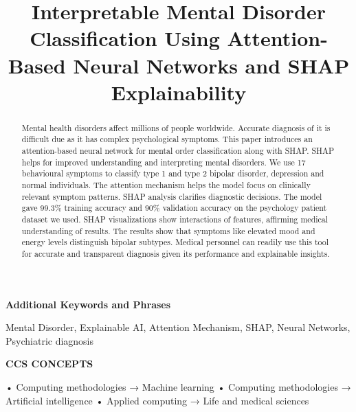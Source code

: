 \documentclass[conference]{IEEEtran}
\begin{document}
\title{Interpretable Mental Disorder Classification Using Attention-Based Neural Networks and SHAP Explainability}

\author{
\and 
{}
\and 
{}
}

\maketitle
\begin{abstract}
Mental health disorders affect millions of people worldwide. Accurate diagnosis of it is difficult due as it has complex psychological symptoms. This paper introduces an attention-based neural network for mental order classification along with SHAP. SHAP helps for improved understanding and interpreting mental disorders. We use 17 behavioural symptoms to classify type 1 and type 2 bipolar disorder, depression and normal individuals. The attention mechanism helps the model focus on clinically relevant symptom patterns. SHAP analysis clarifies diagnostic decisions. The model gave 99.3\% training accuracy and 90\% validation accuracy on the psychology patient dataset we used. SHAP visualizations show interactions of features, affirming medical understanding of results. The results show that symptoms like elevated mood and energy levels distinguish bipolar subtypes. Medical personnel can readily use this tool for accurate and transparent diagnosis given its performance and explainable insights.
\end{abstract}

\textbf{Additional Keywords and Phrases}

Mental Disorder, Explainable AI, Attention Mechanism, SHAP, Neural Networks, Psychiatric diagnosis

\textbf{CCS CONCEPTS}

• Computing methodologies → Machine learning • Computing methodologies → Artificial intelligence • Applied computing → Life and medical sciences
\end{document}

